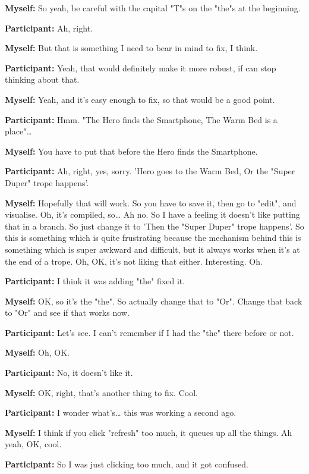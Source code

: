 \documentclass[11pt]{report}
\newcommand{\llabel}[1]{\hypertarget{llineno:#1}{\linelabel{#1}}}
\begin{document}
\begin{linenumbers}
\textbf{Myself:} So yeah, be careful with the capital "T"s on the "the"s at the beginning.

\textbf{Participant:} Ah, right.

\textbf{Myself:} But that is something I need to bear in mind to fix, I think.

\textbf{Participant:} Yeah, that would definitely make it more robust, if can stop thinking about that.

\textbf{Myself:} Yeah, and it's easy enough to fix, so that would be a good point.

\textbf{Participant:} Hmm. "The Hero finds the Smartphone, The Warm Bed is a place"\ldots{}

\textbf{Myself:} You have to put that before the Hero finds the
Smartphone.\llabel{lne:syntax4d2}

\textbf{Participant:} Ah, right, yes, sorry. 'Hero goes to the Warm Bed, Or the "Super Duper" trope happens'.

\textbf{Myself:} Hopefully that will work. So you have to save it, then go to "edit", and visualise. Oh, it's compiled, so\ldots{} Ah no. So I have a feeling it doesn't like putting that in a branch. So just change it to 'Then the "Super Duper" trope happens'. So this is something which is quite frustrating because the mechanism behind this is something which is super awkward and difficult, but it always works when it's at the end of a trope. Oh, OK, it's not liking that either. Interesting. Oh.

\textbf{Participant:} I think it was adding "the" fixed it.

\textbf{Myself:} OK, so it's the "the". So actually change that to "Or". Change that back to "Or" and see if that works now.

\textbf{Participant:} Let's see. I can't remember if I had the "the" there before or not.

\textbf{Myself:} Oh, OK.

\textbf{Participant:} No, it doesn't like it.

\textbf{Myself:} OK, right, that's another thing to fix. Cool.

\textbf{Participant:} I wonder what's\ldots{} this was working a second ago.

\textbf{Myself:} I think if you click "refresh" too much, it queues up all the things. Ah yeah, OK, cool.

\textbf{Participant:} So I was just clicking too much, and it got confused.


\end{linenumbers}
\end{document}
